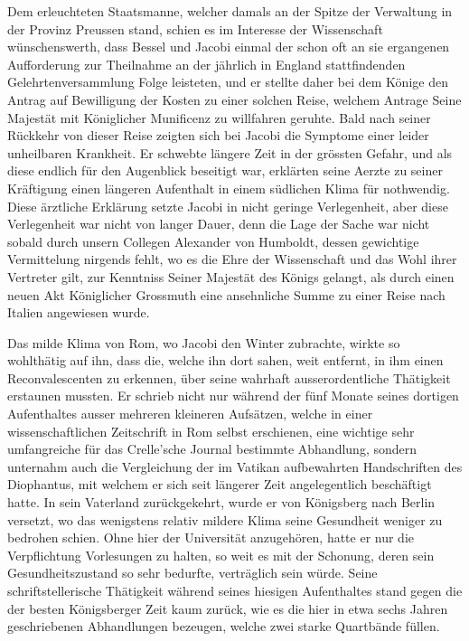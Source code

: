 \documentclass[11pt]{article}
\begin{document}
Dem erleuchteten Staatsmanne, welcher damals an der Spitze der Verwaltung in der Provinz Preussen stand, schien es im Interesse der Wissenschaft wünschenswerth, dass Bessel und Jacobi einmal der schon oft an sie ergangenen Aufforderung zur Theilnahme an der jährlich in England stattfindenden Gelehrtenversammlung Folge leisteten, und er stellte daher bei dem Könige den Antrag auf Bewilligung der Kosten zu einer solchen Reise, welchem Antrage Seine Majestät mit Königlicher Munificenz zu willfahren geruhte. Bald nach seiner Rückkehr von dieser Reise zeigten sich bei Jacobi die Symptome einer leider unheilbaren Krankheit. Er schwebte längere Zeit in der grössten Gefahr, und als diese endlich für den Augenblick beseitigt war, erklärten seine Aerzte zu seiner Kräftigung einen längeren Aufenthalt in einem südlichen Klima für nothwendig. Diese ärztliche Erklärung setzte Jacobi in nicht geringe Verlegenheit, aber diese Verlegenheit war nicht von langer Dauer, denn die Lage der Sache war nicht sobald durch unsern Collegen Alexander von Humboldt, dessen gewichtige Vermittelung nirgends fehlt, wo es die Ehre der Wissenschaft und das Wohl ihrer Vertreter gilt, zur Kenntniss Seiner Majestät des Königs gelangt, als durch einen neuen Akt Königlicher Grossmuth eine ansehnliche Summe zu einer Reise nach Italien angewiesen wurde.

Das milde Klima von Rom, wo Jacobi den Winter zubrachte, wirkte so wohlthätig auf ihn, dass die, welche ihn dort sahen, weit entfernt, in ihm einen Reconvalescenten zu erkennen, über seine wahrhaft ausserordentliche Thätigkeit erstaunen mussten. Er schrieb nicht nur während der fünf Monate seines dortigen Aufenthaltes ausser mehreren kleineren Aufsätzen, welche in einer wissenschaftlichen Zeitschrift in Rom selbst erschienen, eine wichtige sehr umfangreiche für das Crelle’sche Journal bestimmte Abhandlung, sondern unternahm auch die Vergleichung der im Vatikan aufbewahrten Handschriften des Diophantus, mit welchem er sich seit längerer Zeit angelegentlich beschäftigt hatte. In sein Vaterland zurückgekehrt, wurde er von Königsberg nach Berlin versetzt, wo das wenigstens relativ mildere Klima seine Gesundheit weniger zu bedrohen schien. Ohne hier der Universität anzugehören, hatte er nur die Verpflichtung Vorlesungen zu halten, so weit es mit der Schonung, deren sein Gesundheitszustand so sehr bedurfte, verträglich sein würde. Seine schriftstellerische Thätigkeit während seines hiesigen Aufenthaltes stand gegen die der besten Königsberger Zeit kaum zurück, wie es die hier in etwa sechs Jahren geschriebenen Abhandlungen bezeugen, welche zwei starke Quartbände füllen.
\end{document}
